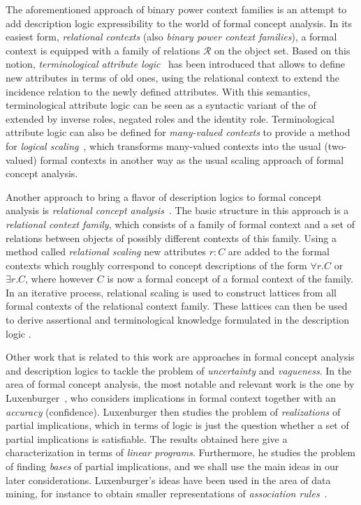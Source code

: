 The aforementioned approach of binary power context families is an attempt to add
description logic expressibility to the world of formal concept analysis.  In its easiest
form, \emph{relational contexts} (also \emph{binary power context families}), a formal
context is equipped with a family of relations $\mathcal{R}$ on the object set.  Based on
this notion, \emph{terminological attribute logic}~\cite{books/math/Prediger00} has been
introduced that allows to define new attributes in terms of old ones, using the relational
context to extend the incidence relation to the newly defined attributes.  With this
semantics, terminological attribute logic can be seen as a syntactic variant of the of
\ALC extended by inverse roles, negated roles and the identity role.  Terminological
attribute logic can also be defined for \emph{many-valued contexts} to provide a method
for \emph{logical scaling}~\cite{conf/krdb/PredigerS99}, which transforms many-valued
contexts into the usual (two-valued) formal contexts in another way as the usual scaling
approach of formal concept analysis.

Another approach to bring a flavor of description logics to formal concept analysis is
\emph{relational concept analysis}~\cite{conf/icfca/RouaneHNV07,
  journals/amai/HaceneHNV13}.  The basic structure in this approach is a \emph{relational
  context family}, which consists of a family of formal context and a set of relations
between objects of possibly different contexts of this family.  Using a method called
\emph{relational scaling} new attributes $r \colon C$ are added to the formal contexts
which roughly correspond to concept descriptions of the form $\forall r. C$ or $\exists
r. C$, where however $C$ is now a formal concept of a formal context of the family.  In an
iterative process, relational scaling is used to construct lattices from all formal
contexts of the relational context family.  These lattices can then be used to derive
assertional and terminological knowledge formulated in the description logic \FLE.

Other work that is related to this work are approaches in formal concept analysis and
description logics to tackle the problem of \emph{uncertainty} and \emph{vagueness}.  In
the area of formal concept analysis, the most notable and relevant work is the one by
Luxenburger~\cite{diss:Luxenburger,Luxenburger91}, who considers implications in formal
context together with an \emph{accuracy} (confidence).  Luxenburger then studies the
problem of \emph{realizations} of partial implications, which in terms of logic is just
the question whether a set of partial implications is satisfiable.  The results obtained
here give a characterization in terms of \emph{linear programs}.  Furthermore, he studies
the problem of finding \emph{bases} of partial implications, and we shall use the main
ideas in our later considerations.  Luxenburger's ideas have been used in the area of data
mining, for instance to obtain smaller representations of \emph{association
  rules}~\cite{DBLP:conf/ki/StummeTBPL01}.

